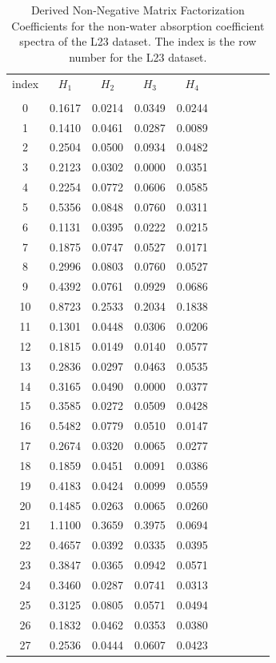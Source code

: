 \begin{table}
\centering
\caption{Derived Non-Negative Matrix Factorization Coefficients for the non-water absorption coefficient spectra of the L23 dataset.  The index is the row number for the L23 dataset. \label{tab:L23}}
\begin{tabular}{cccccccccc}
\hline 
index & $H_1$ & $H_2$ & $H_3$ & $H_4$ \\ 
\\ 
\hline 
\hline 
0& 0.1617& 0.0214& 0.0349& 0.0244\\ 
1& 0.1410& 0.0461& 0.0287& 0.0089\\ 
2& 0.2504& 0.0500& 0.0934& 0.0482\\ 
3& 0.2123& 0.0302& 0.0000& 0.0351\\ 
4& 0.2254& 0.0772& 0.0606& 0.0585\\ 
5& 0.5356& 0.0848& 0.0760& 0.0311\\ 
6& 0.1131& 0.0395& 0.0222& 0.0215\\ 
7& 0.1875& 0.0747& 0.0527& 0.0171\\ 
8& 0.2996& 0.0803& 0.0760& 0.0527\\ 
9& 0.4392& 0.0761& 0.0929& 0.0686\\ 
10& 0.8723& 0.2533& 0.2034& 0.1838\\ 
11& 0.1301& 0.0448& 0.0306& 0.0206\\ 
12& 0.1815& 0.0149& 0.0140& 0.0577\\ 
13& 0.2836& 0.0297& 0.0463& 0.0535\\ 
14& 0.3165& 0.0490& 0.0000& 0.0377\\ 
15& 0.3585& 0.0272& 0.0509& 0.0428\\ 
16& 0.5482& 0.0779& 0.0510& 0.0147\\ 
17& 0.2674& 0.0320& 0.0065& 0.0277\\ 
18& 0.1859& 0.0451& 0.0091& 0.0386\\ 
19& 0.4183& 0.0424& 0.0099& 0.0559\\ 
20& 0.1485& 0.0263& 0.0065& 0.0260\\ 
21& 1.1100& 0.3659& 0.3975& 0.0694\\ 
22& 0.4657& 0.0392& 0.0335& 0.0395\\ 
23& 0.3847& 0.0365& 0.0942& 0.0571\\ 
24& 0.3460& 0.0287& 0.0741& 0.0313\\ 
25& 0.3125& 0.0805& 0.0571& 0.0494\\ 
26& 0.1832& 0.0462& 0.0353& 0.0380\\ 
27& 0.2536& 0.0444& 0.0607& 0.0423\\ 

\end{tabular}
\end{table}
